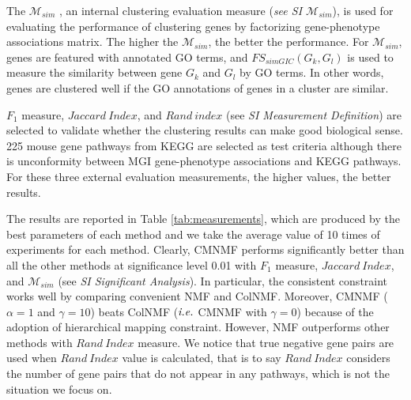 \documentclass{bmcart}
\begin{document}
The $\mathcal{M}_{sim}$ \cite{Bordino2010}, an internal clustering evaluation measure (\emph{{see SI $\mathcal{M}_{sim}$}}), is used for evaluating the performance of clustering genes by factorizing gene-phenotype associations matrix. The higher the $\mathcal{M}_{sim}$, the better the performance. For $\mathcal{M}_{sim}$, genes are featured with annotated GO terms, and $FS_{simGIC}(G_k,G_l)$ \cite{Teng2013} is used to measure the similarity between gene $G_k$ and $G_l$ by GO terms. In other words, genes are clustered well if the GO annotations of genes in a cluster are similar.

$F_1$ measure, $Jaccard\ Index$, and $Rand\ index$ ({see \emph{SI Measurement Definition}}) are selected to validate whether the clustering results can make good biological sense. 225 mouse gene pathways from KEGG are selected as test criteria although there is unconformity between MGI gene-phenotype associations and KEGG pathways. For these three external evaluation measurements, the higher values, the better results.

The results are reported in Table \ref{tab:measurements}, which are produced by the best parameters of each method and we take the average value of 10 times of experiments for each method. Clearly, CMNMF performs significantly better than all the other methods at significance level 0.01 with $F_1$ measure, $Jaccard\ Index$, and $\mathcal{M}_{sim}$ (see \emph{SI Significant Analysis}). In particular, the consistent constraint works well by comparing convenient NMF and ColNMF. Moreover, CMNMF ($\alpha=1$ and $\gamma=10$) beats ColNMF ($\emph{i.e.}$ CMNMF with $\gamma=0$) because of the adoption of hierarchical mapping constraint. However, NMF outperforms other methods with $Rand\ Index$ measure. We notice that true negative gene pairs are used when $Rand\ Index$ value is calculated, that is to say $Rand\ Index$ considers the number of gene pairs that do not appear in any pathways, which is not the situation we focus on.
\end{document}
